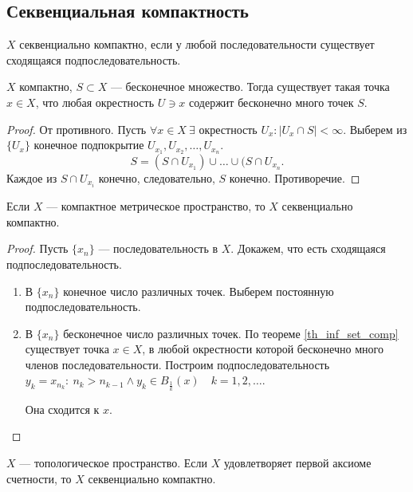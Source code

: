 \documentclass[11pt]{book}
\theoremstyle{definition}
\theoremstyle{plain}
\theoremstyle{plain}
\theoremstyle{definition}
\theoremstyle{remark}
\begin{document}
\subsection{Секвенциальная компактность}
\begin{defn}
    $ X$ {\sf секвенциально  компактно}, если у любой последовательности существует сходящаяся подпоследовательность.
\end{defn}
\begin{thm}\label{th_inf_set_comp}
    $ X$ компактно,  $ S \subset X$ --- бесконечное множество. Тогда существует такая точка $ x \in X$, что любая окрестность $ U \ni x$  содержит бесконечно много точек  $ S$.
\end{thm}
\begin{proof}
    От противного. Пусть $ \forall x \in  X ~ \exists \text{ окрестность } U_x: |U_x \cap S| < \infty$.
    Выберем из $ \{U_x\}$ конечное подпокрытие $ U_{x_1}, U_{x_2}, \ldots , U_{x_{n}}$.
    \[
	S = (S \cap U_{x_1}) \cup \ldots \cup (S \cap U_{x_{n}}
    .\]
    Каждое из $ S \cap U_{x_{i}}$ конечно, следовательно, $ S$ конечно.  Противоречие.
\end{proof}
\begin{thm}\label{th_comp_to_sec_comp}
    Если $ X$ --- компактное метрическое пространство, то $ X$ секвенциально компактно.
\end{thm}
\begin{proof}
    Пусть $ \{x_{n}\}$ --- последовательность в $ X$. Докажем, что есть сходящаяся подпоследовательность.
    \begin{enumerate}
	\item В $ \{x_n\}$ конечное число различных точек. Выберем постоянную подпоследовательность.
	\item В $ \{x_{n}\}$ бесконечное число различных точек. По теореме \ref{th_inf_set_comp} существует точка $ x \in X$, в любой окрестности которой бесконечно много членов последовательности.
	    Построим подпоследовательность $ y_k = x_{n_k}: ~ n_k > n_{k-1} \wedge y_k \in B_{\frac{1}{k}}(x) \quad k = 1, 2, \ldots $.

	    Она сходится к $ x$.
    \end{enumerate}
\end{proof}
\begin{thm}\label{th_1as_sec_comp}
    $ X$ ---  топологическое пространство. Если $ X$ удовлетворяет первой аксиоме счетности,  то $ X$ секвенциально компактно.
\end{thm}
\end{document}
